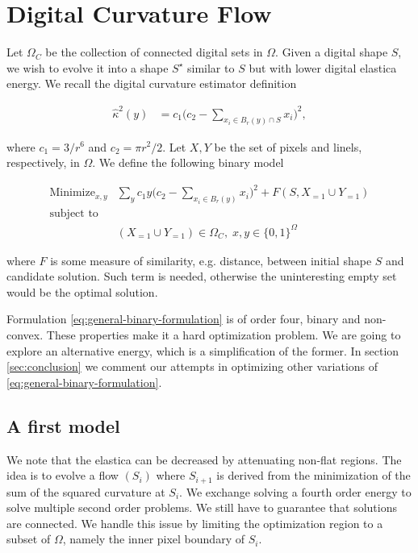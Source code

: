 \documentclass[runningheads]{llncs}
\begin{document}
\section{Digital Curvature Flow}

	Let $\Omega_C$ be the collection of connected digital sets in $\Omega$. Given a digital shape $S$, we wish to evolve it into a shape $S^\star$ similar to $S$ but with lower digital elastica energy. We recall the digital curvature estimator definition
	
\begin{align}
	\hat{\kappa}^2(y) &= c_1\Big( c_2 - \sum_{x_i \in B_r(y) \cap S}{x_i} \Big)^2, 
	\label{eq:curvature-estimator-pixels}
\end{align}

where $c_1=3/r^6$ and $c_2=\pi r^2/2$. Let $X,Y$ be the set of pixels and linels, respectively, in $\Omega$. We define the following binary model
		
\begin{align}
\text{Minimize}_{x,y} & \sum_{y}{c_1y \Big(c_2 - \sum_{x_i \in B_r(y)}{x_i}\Big)^2	 } + F(S,X_{=1} \cup Y_{=1}) \nonumber \\
\text{subject to} & \nonumber \\
& (X_{=1} \cup Y_{=1}) \in \Omega_C, \; x,y \in \{0,1\}^\Omega
\label{eq:general-binary-formulation}
\end{align}


where $F$ is some measure of similarity, e.g. distance, between initial shape $S$ and candidate solution. Such term is needed, otherwise the uninteresting empty set would be the optimal solution.

Formulation \eqref{eq:general-binary-formulation} is of order four, binary and non-convex. These properties make it a hard optimization problem. We are going to explore an alternative energy, which is a simplification of the former. In section \ref{sec:conclusion} we comment our attempts in optimizing  other variations of \eqref{eq:general-binary-formulation}.

\subsection{A first model}

We note that the elastica can be decreased by attenuating non-flat regions. The idea is to evolve a flow $(S_i)$ where $S_{i+1}$ is derived from the minimization of the sum of the squared curvature at $S_i$. We exchange solving a fourth order energy to solve multiple second order problems. We still have to guarantee that solutions are connected. We handle this issue by limiting the optimization region to a subset of $\Omega$, namely the inner pixel boundary of  $S_i$.
\end{document}
